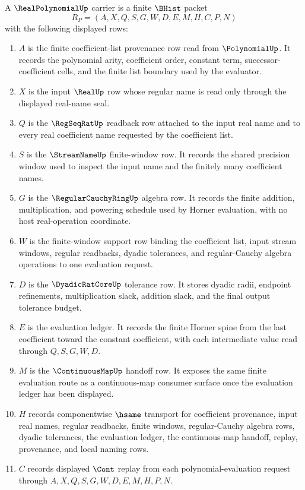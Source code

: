 \begin{definition}
\label{def:real-polynomial-carrier}
A $\RealPolynomialUp$ carrier is a finite $\BHist$ packet
$$
R_P=(A,X,Q,S,G,W,D,E,M,H,C,P,N)
$$
with the following displayed rows:
\begin{enumerate}
\item $A$ is the finite coefficient-list provenance row read from $\PolynomialUp$. It records the polynomial arity, coefficient order, constant term, successor-coefficient cells, and the finite list boundary used by the evaluator.
\item $X$ is the input $\RealUp$ row whose regular name is read only through the displayed real-name seal.
\item $Q$ is the $\RegSeqRatUp$ readback row attached to the input real name and to every real coefficient name requested by the coefficient list.
\item $S$ is the $\StreamNameUp$ finite-window row. It records the shared precision window used to inspect the input name and the finitely many coefficient names.
\item $G$ is the $\RegularCauchyRingUp$ algebra row. It records the finite addition, multiplication, and powering schedule used by Horner evaluation, with no host real-operation coordinate.
\item $W$ is the finite-window support row binding the coefficient list, input stream windows, regular readbacks, dyadic tolerances, and regular-Cauchy algebra operations to one evaluation request.
\item $D$ is the $\DyadicRatCoreUp$ tolerance row. It stores dyadic radii, endpoint refinements, multiplication slack, addition slack, and the final output tolerance budget.
\item $E$ is the evaluation ledger. It records the finite Horner spine from the last coefficient toward the constant coefficient, with each intermediate value read through $Q,S,G,W,D$.
\item $M$ is the $\ContinuousMapUp$ handoff row. It exposes the same finite evaluation route as a continuous-map consumer surface once the evaluation ledger has been displayed.
\item $H$ records componentwise $\hsame$ transport for coefficient provenance, input real names, regular readbacks, finite windows, regular-Cauchy algebra rows, dyadic tolerances, the evaluation ledger, the continuous-map handoff, replay, provenance, and local naming rows.
\item $C$ records displayed $\Cont$ replay from each polynomial-evaluation request through $A,X,Q,S,G,W,D,E,M,H,P,N$.

\end{enumerate}
\end{definition}
